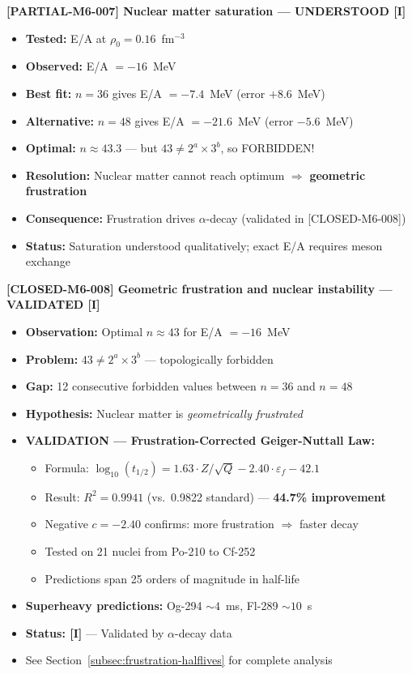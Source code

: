 \begin{tcolorbox}[colback=orange!5!white, colframe=orange!75!black, breakable, title=Open Questions from Topological Pinning Model]
\textbf{[PARTIAL-M6-007] Nuclear matter saturation --- UNDERSTOOD [I]}
\begin{itemize}
    \item \textbf{Tested:} E/A at $\rho_0 = 0.16$~fm$^{-3}$
    \item \textbf{Observed:} E/A $= -16$~MeV
    \item \textbf{Best fit:} $n = 36$ gives E/A $= -7.4$~MeV (error $+8.6$~MeV)
    \item \textbf{Alternative:} $n = 48$ gives E/A $= -21.6$~MeV (error $-5.6$~MeV)
    \item \textbf{Optimal:} $n \approx 43.3$ --- but $43 \neq 2^a \times 3^b$, so FORBIDDEN!
    \item \textbf{Resolution:} Nuclear matter cannot reach optimum $\Rightarrow$ \textbf{geometric frustration}
    \item \textbf{Consequence:} Frustration drives $\alpha$-decay (validated in [CLOSED-M6-008])
    \item \textbf{Status:} Saturation understood qualitatively; exact E/A requires meson exchange
\end{itemize}

\textbf{[CLOSED-M6-008] Geometric frustration and nuclear instability --- VALIDATED [I]}
\begin{itemize}
    \item \textbf{Observation:} Optimal $n \approx 43$ for E/A $= -16$~MeV
    \item \textbf{Problem:} $43 \neq 2^a \times 3^b$ --- topologically forbidden
    \item \textbf{Gap:} 12 consecutive forbidden values between $n = 36$ and $n = 48$
    \item \textbf{Hypothesis:} Nuclear matter is \emph{geometrically frustrated}
    \item \textbf{VALIDATION --- Frustration-Corrected Geiger-Nuttall Law:}
    \begin{itemize}
        \item Formula: $\log_{10}(t_{1/2}) = 1.63 \cdot Z/\sqrt{Q} - 2.40 \cdot \varepsilon_f - 42.1$
        \item Result: $R^2 = 0.9941$ (vs.\ 0.9822 standard) --- \textbf{44.7\% improvement}
        \item Negative $c = -2.40$ confirms: more frustration $\Rightarrow$ faster decay
        \item Tested on 21 nuclei from Po-210 to Cf-252
        \item Predictions span 25 orders of magnitude in half-life
    \end{itemize}
    \item \textbf{Superheavy predictions:} Og-294 $\sim 4$~ms, Fl-289 $\sim 10$~s
    \item \textbf{Status: [I]} --- Validated by $\alpha$-decay data
    \item See Section~\ref{subsec:frustration-halflives} for complete analysis
\end{itemize}

\end{tcolorbox}

